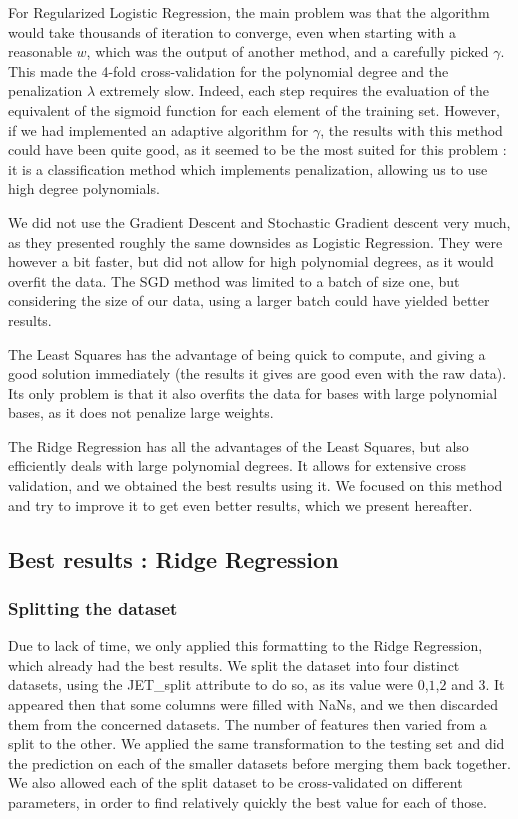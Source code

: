 \documentclass[10pt,conference,compsocconf]{IEEEtran}
\begin{document}
For Regularized Logistic Regression, the main problem was that the algorithm would take thousands of iteration to converge, even when starting with a reasonable $w$, which was the output of another method, and a carefully picked $\gamma$. This made the 4-fold cross-validation for the polynomial degree and the penalization $\lambda$ extremely slow. Indeed, each step requires the evaluation of the equivalent of the sigmoid function for each element of the training set. However, if we had implemented an adaptive algorithm for $\gamma$, the results with this method could have been quite good, as it seemed to be the most suited for this problem : it is a classification method which implements penalization, allowing us to use high degree polynomials.

We did not use the Gradient Descent and Stochastic Gradient descent very much, as they presented roughly the same downsides as Logistic Regression. They were however a bit faster, but did not allow for high polynomial degrees, as it would overfit the data. The SGD method was limited to a batch of size one, but considering the size of our data, using a larger batch could have yielded better results.

The Least Squares has the advantage of being quick to compute, and giving a good solution immediately (the results it gives are good even with the raw data). Its only problem is that it also overfits the data for bases with large polynomial bases, as it does not penalize large weights.

The Ridge Regression has all the advantages of the Least Squares, but also efficiently deals with large polynomial degrees. It allows for extensive cross validation, and we obtained the best results using it. We focused on this method and try to improve it to get even better results, which we present hereafter.


\subsection{Best results : Ridge Regression}
\subsubsection{Splitting the dataset}
Due to lack of time, we only applied this formatting to the Ridge Regression, which already had the best results. We split the dataset into four distinct datasets, using the JET\_split attribute to do so, as its value were $0$,$1$,$2$ and $3$. It appeared then that some columns were filled with NaNs, and we then discarded them from the concerned datasets. The number of features then varied from a split to the other. We applied the same transformation to the testing set and did the prediction on each of the smaller datasets before merging them back together. We also allowed each of the split dataset to be cross-validated on different parameters, in order to find relatively quickly the best value for each of those.
\end{document}
